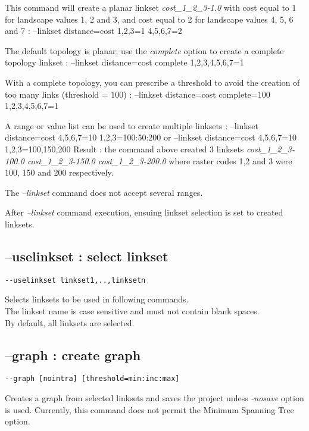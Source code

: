 \documentclass[a4paper,10pt]{report}
\newenvironment{cmd}
{\quote\Verbatim}
{\endVerbatim\endquote}
\begin{document}
This command will create a planar linkset \textit{cost\_1\_2\_3-1.0} with cost equal to 1 for landscape values 1, 2 and 3, and cost equal to 2 for landscape values 4, 5, 6 and 7 :
\begin{cmd}
--linkset distance=cost 1,2,3=1 4,5,6,7=2
\end{cmd}


The default topology is planar; use the \textit{complete} option to create a complete topology linkset :
\begin{cmd}
--linkset distance=cost complete 1,2,3,4,5,6,7=1
\end{cmd}

With a complete topology, you can prescribe a threshold to avoid the creation of too many links (threshold = 100) :
\begin{cmd}
--linkset distance=cost complete=100 1,2,3,4,5,6,7=1
\end{cmd}

A range or value list can be used to create multiple linksets :
\begin{cmd}
--linkset distance=cost 4,5,6,7=10 1,2,3=100:50:200
or
--linkset distance=cost 4,5,6,7=10 1,2,3=100,150,200
\end{cmd}
Result : the command above created 3 linksets \textit{cost\_1\_2\_3-100.0 cost\_1\_2\_3-150.0 cost\_1\_2\_3-200.0}
where raster codes 1,2 and 3 were 100, 150 and 200 respectively.

The \textit{--linkset} command does not accept several ranges.

After \textit{--linkset} command execution, ensuing linkset selection is set to created linksets. 

\subsection{--uselinkset : select linkset}
\begin{verbatim}
--uselinkset linkset1,..,linksetn
\end{verbatim}
Selects linksets to be used in following commands.\\
The linkset name is case sensitive and must not contain blank spaces.\\
By default, all linksets are selected.

\subsection{--graph : create graph}
\begin{verbatim}
--graph [nointra] [threshold=min:inc:max]
\end{verbatim}
Creates a graph from selected linksets and saves the project unless \textit{-nosave} option is used. 
Currently, this command does not permit the Minimum Spanning Tree option.
\end{document}
